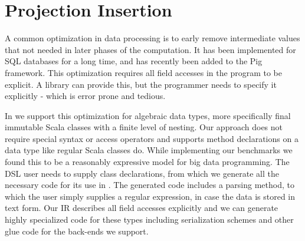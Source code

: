 \section{Projection Insertion}
\label{sec:field-reduction}

A common optimization in data processing is to early remove intermediate values that not needed in later phases of the computation. It has been implemented for SQL databases for a long time, and has recently been added to the Pig framework. This optimization requires all field accesses in the program to be explicit. A library can provide this, but the programmer needs to specify it explicitly - which is error prone and tedious. 


In \tool we support this optimization for algebraic data types, more specifically final immutable Scala classes with a finite level of nesting. Our approach does not require special syntax or access operators and supports method declarations on a data type like regular Scala classes do. While implementing our benchmarks we found this to be a reasonably expressive model for big data programming. The DSL user needs to supply class declarations, from which we generate all the necessary code for its use in \tool. The generated code includes a parsing method, to which the user simply supplies a regular expression, in case the data is stored in text form. Our IR describes all field accesses explicitly and we can generate highly specialized code for these types including serialization schemes and other glue code for the back-ends we support.


